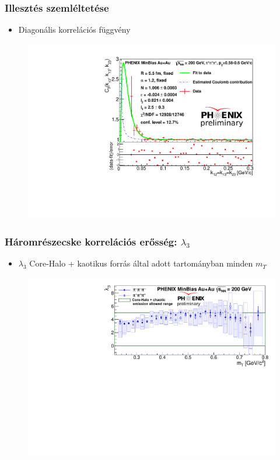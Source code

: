 \documentclass{beamer}
\begin{document}
\begin{frame}
\frametitle{Illesztés szemléltetése}
\begin{itemize}
\setlength{\itemsep}{16pt}
\item Diagonális korrelációs függvény
\end{itemize}
\begin{figure}
\includegraphics[scale=0.45]{pic/diag_highpt.pdf}
\end{figure}
\end{frame}

\begin{frame}
\frametitle{Háromrészecske korrelációs erősség: $\lambda_3$}
\begin{itemize}
\setlength{\itemsep}{10pt}
\item $\lambda_3$ Core-Halo  + kaotikus forrás által adott tartományban minden $m_T$
\end{itemize}
\begin{figure}
\colorbox{white}{\includegraphics[scale=0.6]{pic/lambda3}}
\end{figure}
\end{frame}
\end{document}
